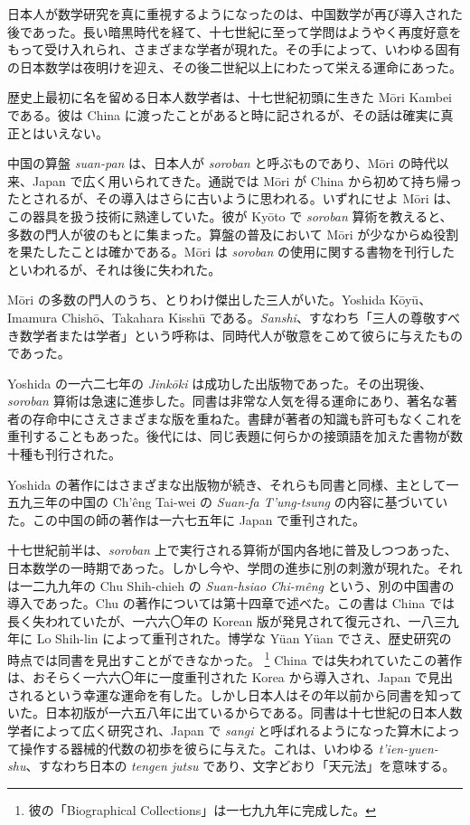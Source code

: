 \documentclass[11pt]{article}
\newcommand{\scanpage}[2]{\clearpage\setcounter{footnote}{0}\noindent{\footnotesize\color{gray}PDF #1 頁 · #2}\par\medskip}
\newcommand{\scanfooter}{}
\begin{document}
日本人が数学研究を真に重視するようになったのは、中国数学が再び導入された後であった。長い暗黒時代を経て、十七世紀に至って学問はようやく再度好意をもって受け入れられ、さまざまな学者が現れた。その手によって、いわゆる固有の日本数学は夜明けを迎え、その後二世紀以上にわたって栄える運命にあった。

歴史上最初に名を留める日本人数学者は、十七世紀初頭に生きた Mōri Kambei である。彼は China に渡ったことがあると時に記されるが、その話は確実に真正とはいえない。

中国の算盤 \emph{suan-pan} は、日本人が \emph{soroban} と呼ぶものであり、Mōri の時代以来、Japan で広く用いられてきた。通説では Mōri が China から初めて持ち帰ったとされるが、その導入はさらに古いように思われる。いずれにせよ Mōri は、この器具を扱う技術に熟達していた。彼が Kyōto で \emph{soroban} 算術を教えると、多数の門人が彼のもとに集まった。算盤の普及において Mōri が少なからぬ役割を果たしたことは確かである。Mōri は \emph{soroban} の使用に関する書物を刊行したといわれるが、それは後に失われた。
\scanfooter

\scanpage{0171}{第22章、印刷頁157}
Mōri の多数の門人のうち、とりわけ傑出した三人がいた。Yoshida Kōyū、Imamura Chishō、Takahara Kisshū である。\emph{Sanshi}、すなわち「三人の尊敬すべき数学者または学者」という呼称は、同時代人が敬意をこめて彼らに与えたものであった。

Yoshida の一六二七年の \emph{Jinkōki} は成功した出版物であった。その出現後、\emph{soroban} 算術は急速に進歩した。同書は非常な人気を得る運命にあり、著名な著者の存命中にさえさまざまな版を重ねた。書肆が著者の知識も許可もなくこれを重刊することもあった。後代には、同じ表題に何らかの接頭語を加えた書物が数十種も刊行された。

Yoshida の著作にはさまざまな出版物が続き、それらも同書と同様、主として一五九三年の中国の Ch'êng Tai-wei の \emph{Suan-fa T'ung-tsung} の内容に基づいていた。この中国の師の著作は一六七五年に Japan で重刊された。

十七世紀前半は、\emph{soroban} 上で実行される算術が国内各地に普及しつつあった、日本数学の一時期であった。しかし今や、学問の進歩に別の刺激が現れた。それは一二九九年の Chu Shih-chieh の \emph{Suan-hsiao Chi-mêng} という、別の中国書の導入であった。Chu の著作については第十四章で述べた。この書は China では長く失われていたが、一六六〇年の Korean 版が発見されて復元され、一八三九年に Lo Shih-lin によって重刊された。博学な Yüan Yüan でさえ、歴史研究の時点では同書を見出すことができなかった。
\footnote{彼の「Biographical Collections」は一七九九年に完成した。}
China では失われていたこの著作は、おそらく一六六〇年に一度重刊された Korea から導入され、Japan で見出されるという幸運な運命を有した。しかし日本人はその年以前から同書を知っていた。日本初版が一六五八年に出ているからである。同書は十七世紀の日本人数学者によって広く研究され、Japan で \emph{sangi} と呼ばれるようになった算木によって操作する器械的代数の初歩を彼らに与えた。これは、いわゆる \emph{t'ien-yuen-shu}、すなわち日本の \emph{tengen jutsu} であり、文字どおり「天元法」を意味する。
\end{document}
